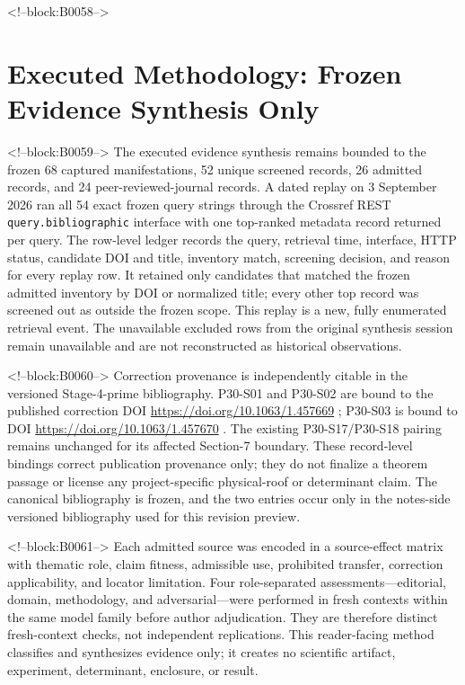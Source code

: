 \documentclass[11pt,a4paper]{article}
\begin{document}
<!--block:B0058-->
\section{Executed Methodology: Frozen Evidence Synthesis Only}

<!--block:B0059-->
The executed evidence synthesis remains bounded to the frozen 68 captured
manifestations, 52 unique screened records, 26 admitted records, and 24
peer-reviewed-journal records.  A dated replay on 3 September 2026 ran all
54 exact frozen query strings through the Crossref REST
\texttt{query.bibliographic} interface with one top-ranked metadata record
returned per query.  The row-level ledger records the query, retrieval time,
interface, HTTP status, candidate DOI and title, inventory match, screening
decision, and reason for every replay row.  It retained only candidates that
matched the frozen admitted inventory by DOI or normalized title; every other
top record was screened out as outside the frozen scope.  This replay is a new,
fully enumerated retrieval event.  The unavailable excluded rows from the
original synthesis session remain unavailable and are not reconstructed as
historical observations.

<!--block:B0060-->
Correction provenance is independently citable in the versioned Stage-4-prime
bibliography.  P30-S01 and P30-S02 are bound to the published correction
DOI \url{https://doi.org/10.1063/1.457669} \citep{P30-C01}; P30-S03 is bound
to DOI \url{https://doi.org/10.1063/1.457670} \citep{P30-C02}.  The existing
P30-S17/P30-S18 pairing remains unchanged for its affected Section-7 boundary.
These record-level bindings correct publication provenance only; they do not
finalize a theorem passage or license any project-specific physical-roof or
determinant claim.  The canonical bibliography is frozen, and the two entries
occur only in the notes-side versioned bibliography used for this revision preview.

<!--block:B0061-->
Each admitted source was encoded in a source-effect matrix with thematic role,
claim fitness, admissible use, prohibited transfer, correction applicability,
and locator limitation.  Four role-separated assessments---editorial, domain,
methodology, and adversarial---were performed in fresh contexts within the same
model family before author adjudication.  They are therefore distinct
fresh-context checks, not independent replications.  This reader-facing method
classifies and synthesizes evidence only; it creates no scientific artifact,
experiment, determinant, enclosure, or result.
\end{document}
